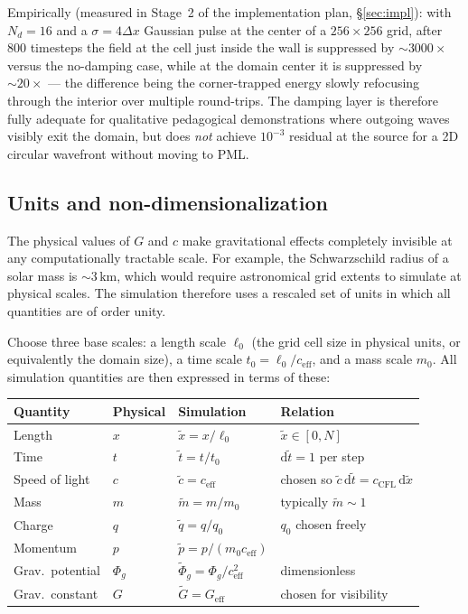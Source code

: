 \documentclass[11pt,a4paper]{article}
\newcommand{\Phig}{\Phi_g}
\newcommand{\dd}{\mathrm{d}}
\begin{document}
Empirically (measured in Stage~2 of the implementation plan, §\ref{sec:impl}): with $N_d=16$ and a $\sigma=4\Delta x$ Gaussian pulse at the center of a $256\times256$ grid, after 800 timesteps the field at the cell just inside the wall is suppressed by $\sim 3000\times$ versus the no-damping case, while at the domain center it is suppressed by $\sim 20\times$ --- the difference being the corner-trapped energy slowly refocusing through the interior over multiple round-trips.  The damping layer is therefore fully adequate for qualitative pedagogical demonstrations where outgoing waves visibly exit the domain, but does \emph{not} achieve $10^{-3}$ residual at the source for a 2D circular wavefront without moving to PML.

\subsection{Units and non-dimensionalization}
\label{sec:units}

The physical values of $G$ and $c$ make gravitational effects completely invisible at any computationally tractable scale.  For example, the Schwarzschild radius of a solar mass is $\sim 3\,\mathrm{km}$, which would require astronomical grid extents to simulate at physical scales.  The simulation therefore uses a rescaled set of units in which all quantities are of order unity.

Choose three base scales: a length scale $\ell_0$ (the grid cell size in physical units, or equivalently the domain size), a time scale $t_0 = \ell_0/c_{\mathrm{eff}}$, and a mass scale $m_0$.  All simulation quantities are then expressed in terms of these:

\begin{center}
\begin{tabular}{@{}L{4cm}L{3cm}L{3cm}L{3cm}@{}}
\toprule
\textbf{Quantity} & \textbf{Physical} & \textbf{Simulation} & \textbf{Relation} \\
\midrule
Length & $x$ & $\tilde{x} = x/\ell_0$ & $\tilde{x} \in [0, N]$ \\
Time & $t$ & $\tilde{t} = t/t_0$ & $\dd\tilde{t} = 1$ per step \\
Speed of light & $c$ & $\tilde{c} = c_{\mathrm{eff}}$ & chosen so $\tilde{c}\,\dd\tilde{t} = c_{\mathrm{CFL}}\,\dd\tilde{x}$ \\
Mass & $m$ & $\tilde{m} = m/m_0$ & typically $\tilde{m} \sim 1$ \\
Charge & $q$ & $\tilde{q} = q/q_0$ & $q_0$ chosen freely \\
Momentum & $p$ & $\tilde{p} = p/(m_0 c_{\mathrm{eff}})$ & \\
Grav.\ potential & $\Phig$ & $\tilde{\Phi}_g = \Phig/c_{\mathrm{eff}}^2$ & dimensionless \\
Grav.\ constant & $G$ & $\tilde{G} = G_{\mathrm{eff}}$ & chosen for visibility \\
\bottomrule
\end{tabular}
\end{center}
\end{document}

